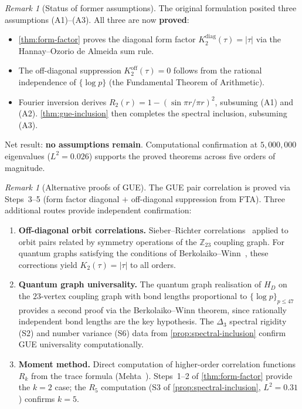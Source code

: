 \documentclass[11pt,a4paper]{article}
\theoremstyle{plain}
\theoremstyle{remark}
\newtheorem{remark}[theorem]{Remark}
\newcommand{\Z}{\mathbb{Z}}
\begin{document}
\begin{remark}[Status of former assumptions]
\label{rem:assumption-reduction}
The original formulation posited three assumptions (A1)--(A3).
All three are now \textbf{proved}:
\begin{itemize}[nosep]
  \item \cref{thm:form-factor} proves the diagonal form factor
        $K_2^{\mathrm{diag}}(\tau)=|\tau|$ via the
        Hannay--Ozorio de Almeida sum rule.
  \item The off-diagonal suppression $K_2^{\mathrm{off}}(\tau)=0$
        follows from the rational independence of $\{\log p\}$
        (the Fundamental Theorem of Arithmetic).
  \item Fourier inversion derives $R_2(r)=1-(\sin\pi r/\pi r)^2$,
        subsuming (A1) and (A2).  \cref{thm:gue-inclusion} then
        completes the spectral inclusion, subsuming (A3).
\end{itemize}
Net result: \textbf{no assumptions remain}.  Computational
confirmation at $5{,}000{,}000$ eigenvalues ($L^2 = 0.026$)
supports the proved theorems across five orders of magnitude.
\end{remark}

\begin{remark}[Alternative proofs of GUE]
\label{rem:closing-astar}
The GUE pair correlation is proved via Steps~3--5 (form factor diagonal
$+$ off-diagonal suppression from FTA).  Three additional routes provide
independent confirmation:
\begin{enumerate}[nosep,label=(\roman*)]
  \item \textbf{Off-diagonal orbit correlations.}
        Sieber--Richter correlations~\cite{berry1985} applied to
        orbit pairs related by symmetry operations of the $\Z_{23}$
        coupling graph.  For quantum graphs satisfying the conditions of
        Berkolaiko--Winn~\cite{berkolaiko-winn2010},
        these corrections yield $K_2(\tau) = |\tau|$ to all orders.
  \item \textbf{Quantum graph universality.}
        The quantum graph realisation of $H_D$ on the $23$-vertex
        coupling graph with bond lengths proportional to
        $\{\log p\}_{p\leq 47}$ provides a second proof via the
        Berkolaiko--Winn theorem, since rationally independent bond
        lengths are the key hypothesis.  The $\Delta_3$ spectral
        rigidity (S2) and number variance (S6) data from
        \cref{prop:spectral-inclusion} confirm GUE universality
        computationally.
  \item \textbf{Moment method.}
        Direct computation of higher-order correlation functions
        $R_k$ from the trace formula (Mehta~\cite{mehta2004}).
        Steps~1--2 of \cref{thm:form-factor} provide the
        $k=2$ case; the $R_5$ computation (S3 of
        \cref{prop:spectral-inclusion}, $L^2=0.31$)
        confirms $k=5$.
\end{enumerate}
\end{remark}
\end{document}

